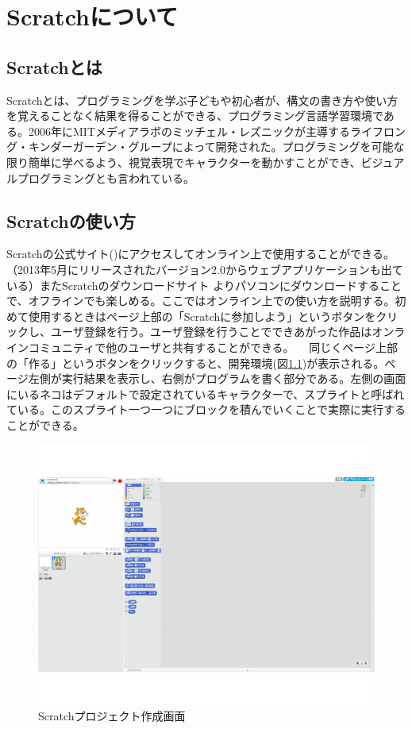 \documentclass[a4paper,10pt,onecolumn,oneside,openany]{jsbook}
\begin{document}
\chapter{Scratchについて}
\section{Scratchとは}
Scratchとは、プログラミングを学ぶ子どもや初心者が、構文の書き方や使い方を覚えることなく結果を得ることができる、プログラミング言語学習環境である。2006年にMITメディアラボのミッチェル・レズニックが主導するライフロング・キンダーガーデン・グループによって開発された。プログラミングを可能な限り簡単に学べるよう、視覚表現でキャラクターを動かすことができ、ビジュアルプログラミングとも言われている。
\section{Scratchの使い方}
Scratchの公式サイト(\cite{scratch})にアクセスしてオンライン上で使用することができる。（2013年5月にリリースされたバージョン2.0からウェブアプリケーションも出ている）またScratchのダウンロードサイト\cite{scratch_official}
よりパソコンにダウンロードすることで、オフラインでも楽しめる。ここではオンライン上での使い方を説明する。初めて使用するときはページ上部の「Scratchに参加しよう」というボタンをクリックし、ユーザ登録を行う。ユーザ登録を行うことでできあがった作品はオンラインコミュニティで他のユーザと共有することができる。
　同じくページ上部の「作る」というボタンをクリックすると、開発環境(図\ref{editor})が表示される。ページ左側が実行結果を表示し、右側がプログラムを書く部分である。左側の画面にいるネコはデフォルトで設定されているキャラクターで、スプライトと呼ばれている。このスプライト一つ一つにブロックを積んでいくことで実際に実行することができる。
\begin{figure}[!h]
  \centering
    \includegraphics[scale=0.5]{scratch_editor_main.pdf}
  \caption{Scratchプロジェクト作成画面}
  \label{editor}
 \end{figure}
\end{document}
